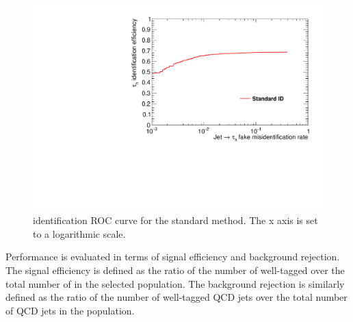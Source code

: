 \begin{figure}
    \centering
    \includegraphics[width=\textwidth]{Images/ROC_comp_std.pdf}
    \caption{\tauh identification ROC curve for the standard method. The x axis is set to a logarithmic scale.}
    \label{fig:std_ROC}
\end{figure}

Performance is evaluated in terms of signal efficiency and background rejection. The signal efficiency is defined as the ratio of the number of well-tagged \tauh over the total number of \tauh in the selected population. The background rejection is similarly defined as the ratio of the number of well-tagged QCD jets over the total number of QCD jets in the population.

